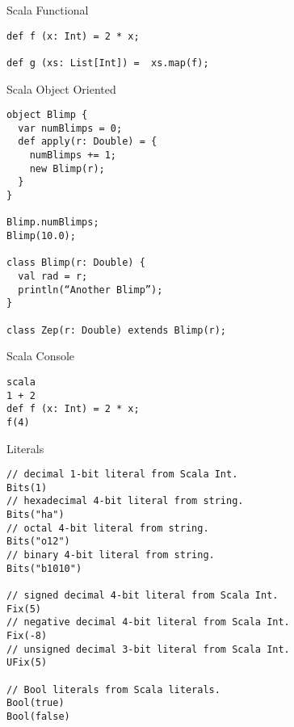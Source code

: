 \documentclass[xcolor=pdflatex,dvipsnames,table]{beamer}
\newenvironment{FramedVerb}%
{\VerbatimEnvironment
\begin{Sbox}\begin{minipage}{.94\textwidth}\begin{Verbatim}}%
{\end{Verbatim}\end{minipage}\end{Sbox}
\setlength{\fboxsep}{8pt}\fbox{\TheSbox}}
\begin{document}
\begin{frame}[fragile]{Scala Functional}

\begin{lstlisting}
def f (x: Int) = 2 * x;

def g (xs: List[Int]) =  xs.map(f);
\end{lstlisting}
\end{frame}

\begin{frame}{Scala Object Oriented}

\begin{lstlisting}
object Blimp {
  var numBlimps = 0;
  def apply(r: Double) = {
    numBlimps += 1;
    new Blimp(r);
  }
}

Blimp.numBlimps;
Blimp(10.0);

class Blimp(r: Double) {
  val rad = r;
  println(“Another Blimp”);
}

class Zep(r: Double) extends Blimp(r);
\end{lstlisting}

\end{frame}

\begin{frame}[fragile]{Scala Console}
\begin{lstlisting}
scala
1 + 2
def f (x: Int) = 2 * x;
f(4)
\end{lstlisting}
\end{frame}


\begin{frame}[fragile]{Literals}
\begin{lstlisting}
// decimal 1-bit literal from Scala Int. 
Bits(1)       
// hexadecimal 4-bit literal from string.
Bits("ha")    
// octal 4-bit literal from string. 
Bits("o12")   
// binary 4-bit literal from string.
Bits("b1010") 

// signed decimal 4-bit literal from Scala Int.
Fix(5)        
// negative decimal 4-bit literal from Scala Int.
Fix(-8)       
// unsigned decimal 3-bit literal from Scala Int.
UFix(5)       

// Bool literals from Scala literals.
Bool(true)    
Bool(false)
\end{lstlisting}
\end{frame}
 
\end{document}
